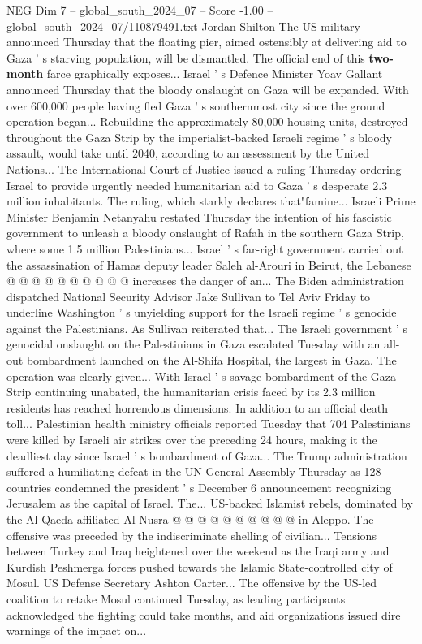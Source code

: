 \begin{textsample}{NEG Dim 7 – global\_south\_2024\_07 – Score -1.00 – global\_south\_2024\_07/110879491.txt}  \label{ex:f7_neg_354}
Jordan Shilton The US military announced Thursday that the floating pier, aimed ostensibly at delivering aid to Gaza ' s starving population, will be dismantled.
The official end of this \textbf{two-month} farce graphically exposes...
Israel ' s Defence Minister Yoav Gallant announced Thursday that the bloody onslaught on Gaza will be expanded.
With over 600,000 people having fled Gaza ' s southernmost city since the ground operation began...
Rebuilding the approximately 80,000 housing units, destroyed throughout the Gaza Strip by the imperialist-backed Israeli regime ' s bloody assault, would take until 2040, according to an assessment by the United Nations...
The International Court of Justice issued a ruling Thursday ordering Israel to provide urgently needed humanitarian aid to Gaza ' s desperate 2.3 million inhabitants.
The ruling, which starkly declares that"famine...
Israeli Prime Minister Benjamin Netanyahu restated Thursday the intention of his fascistic government to unleash a bloody onslaught of Rafah in the southern Gaza Strip, where some 1.5 million Palestinians...
Israel ' s far-right government carried out the assassination of Hamas deputy leader Saleh al-Arouri in Beirut, the Lebanese @ @ @ @ @ @ @ @ @ @ increases the danger of an...
The Biden administration dispatched National Security Advisor Jake Sullivan to Tel Aviv Friday to underline Washington ' s unyielding support for the Israeli regime ' s genocide against the Palestinians.
As Sullivan reiterated that...
The Israeli government ' s genocidal onslaught on the Palestinians in Gaza escalated Tuesday with an all-out bombardment launched on the Al-Shifa Hospital, the largest in Gaza.
The operation was clearly given...
With Israel ' s savage bombardment of the Gaza Strip continuing unabated, the humanitarian crisis faced by its 2.3 million residents has reached horrendous dimensions.
In addition to an official death toll...
Palestinian health ministry officials reported Tuesday that 704 Palestinians were killed by Israeli air strikes over the preceding 24 hours, making it the deadliest day since Israel ' s bombardment of Gaza...
The Trump administration suffered a humiliating defeat in the UN General Assembly Thursday as 128 countries condemned the president ' s December 6 announcement recognizing Jerusalem as the capital of Israel.
The...
US-backed Islamist rebels, dominated by the Al Qaeda-affiliated Al-Nusra @ @ @ @ @ @ @ @ @ @ in Aleppo.
The offensive was preceded by the indiscriminate shelling of civilian...
Tensions between Turkey and Iraq heightened over the weekend as the Iraqi army and Kurdish Peshmerga forces pushed towards the Islamic State-controlled city of Mosul.
US Defense Secretary Ashton Carter...
The offensive by the US-led coalition to retake Mosul continued Tuesday, as leading participants acknowledged the fighting could take months, and aid organizations issued dire warnings of the impact on...

\end{textsample}
